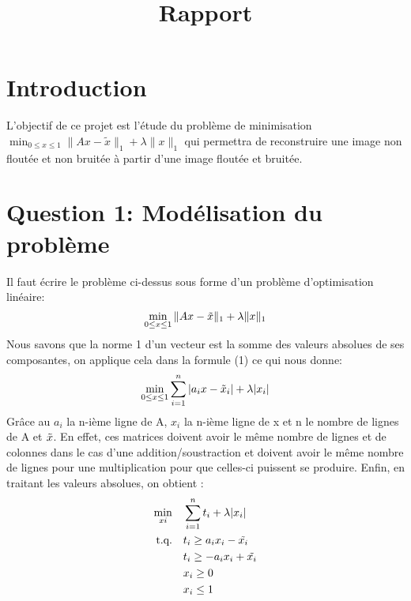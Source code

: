 \documentclass{rapport}
\title{Rapport} %
\begin{document}




        
\fairemarges %
\fairepagedegarde %
\tabledematieres %



\section{Introduction} 

L’objectif de ce projet est l’étude du problème de minimisation $\min_{0 \le x \le 1} \| Ax-\tilde{x} \|_1 + \lambda \| x \|_1$ qui permettra de reconstruire une image non floutée et non bruitée à partir d’une image floutée et bruitée.

\section{Question 1: Modélisation du problème}
Il faut écrire le problème ci-dessus sous forme d’un problème d’optimisation linéaire: 
\begin{equation}
    \min_{0 \le x \le 1} \| Ax-\Tilde{x} \|_1 + \lambda \| x \|_1
\end{equation}
Nous savons que la norme 1 d’un vecteur est la somme des valeurs absolues de ses composantes, on applique cela dans la formule (1) ce qui nous donne:
\begin{equation}
    \min_{0 \le x \le 1} \sum_{i=1}^n |a_i x-\Tilde{x}_i | + \lambda |x_i|
\end{equation}
Grâce au $a_i$ la n-ième ligne de A, $x_i$ la n-ième ligne de x et n le nombre de lignes de A et $\Tilde{x}$. En effet, ces matrices doivent avoir le même nombre de lignes et de colonnes dans le cas d’une addition/soustraction et doivent avoir le même nombre de lignes pour une multiplication pour que celles-ci puissent se produire. Enfin, en traitant les valeurs absolues, on obtient :
\begin{equation}
    \begin{aligned}
        \min_{xi} \quad&\sum_{i=1}^n t_i + \lambda|x_i|\\
        \textrm{t.q.} \quad 
            &t_i\geq a_ix_i-\Tilde{x_i}\\
            &t_i\geq -a_ix_i+\Tilde{x_i}\\
            &x_i\geq 0\\
            &x_i\leq1\
    \end{aligned}
\end{equation}
\end{document}
